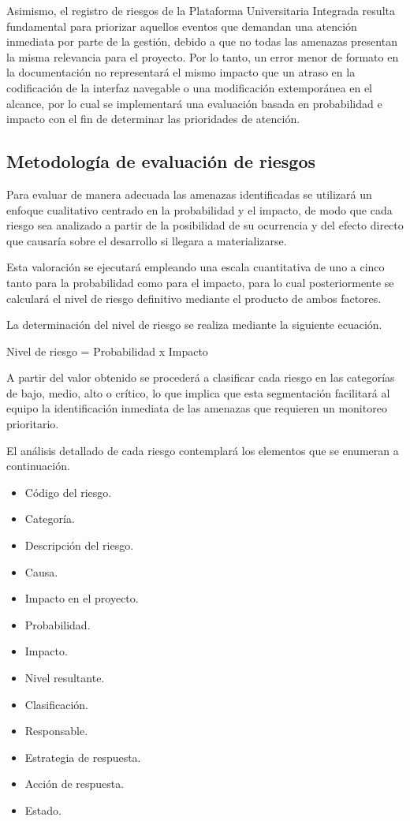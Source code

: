 \documentclass[11pt,spanish]{article}
\begin{document}
Asimismo, el registro de riesgos de la Plataforma Universitaria Integrada resulta fundamental para priorizar aquellos eventos que demandan una atención inmediata por parte de la gestión, debido a que no todas las amenazas presentan la misma relevancia para el proyecto. Por lo tanto, un error menor de formato en la documentación no representará el mismo impacto que un atraso en la codificación de la interfaz navegable o una modificación extemporánea en el alcance, por lo cual se implementará una evaluación basada en probabilidad e impacto con el fin de determinar las prioridades de atención.

\subsection{Metodología de evaluación de riesgos}

Para evaluar de manera adecuada las amenazas identificadas se utilizará un enfoque cualitativo centrado en la probabilidad y el impacto, de modo que cada riesgo sea analizado a partir de la posibilidad de su ocurrencia y del efecto directo que causaría sobre el desarrollo si llegara a materializarse.

Esta valoración se ejecutará empleando una escala cuantitativa de uno a cinco tanto para la probabilidad como para el impacto, para lo cual posteriormente se calculará el nivel de riesgo definitivo mediante el producto de ambos factores.

La determinación del nivel de riesgo se realiza mediante la siguiente ecuación.

\begin{center}
Nivel de riesgo = Probabilidad x Impacto
\end{center}

A partir del valor obtenido se procederá a clasificar cada riesgo en las categorías de bajo, medio, alto o crítico, lo que implica que esta segmentación facilitará al equipo la identificación inmediata de las amenazas que requieren un monitoreo prioritario.

El análisis detallado de cada riesgo contemplará los elementos que se enumeran a continuación.

\begin{itemize}[leftmargin=*, label={\textbullet}]
    \item Código del riesgo.
    \item Categoría.
    \item Descripción del riesgo.
    \item Causa.
    \item Impacto en el proyecto.
    \item Probabilidad.
    \item Impacto.
    \item Nivel resultante.
    \item Clasificación.
    \item Responsable.
    \item Estrategia de respuesta.
    \item Acción de respuesta.
    \item Estado.
\end{itemize}
\end{document}
